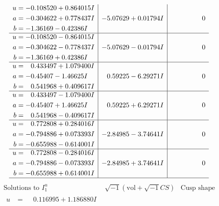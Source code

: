 \documentclass[1p]{elsarticle_modified}
\theoremstyle{definition}
\newcommand{\I}{\sqrt{-1}}
\begin{document}
$$\begin{array}{c|c|c}
\begin{aligned}
u &= -0.108520 + 0.864015 I \\
a &= -0.304622 + 0.778437 I \\
b &= -1.36169 - 0.42386 I\end{aligned}
 & -5.07629 + 0.01794 I & \phantom{-0.000000 } 0 \\ \hline\begin{aligned}
u &= -0.108520 - 0.864015 I \\
a &= -0.304622 - 0.778437 I \\
b &= -1.36169 + 0.42386 I\end{aligned}
 & -5.07629 - 0.01794 I & \phantom{-0.000000 } 0 \\ \hline\begin{aligned}
u &= \phantom{-}0.433497 + 1.079400 I \\
a &= -0.45407 - 1.46625 I \\
b &= \phantom{-}0.541968 + 0.409617 I\end{aligned}
 & \phantom{-}0.59225 - 6.29271 I & \phantom{-0.000000 } 0 \\ \hline\begin{aligned}
u &= \phantom{-}0.433497 - 1.079400 I \\
a &= -0.45407 + 1.46625 I \\
b &= \phantom{-}0.541968 - 0.409617 I\end{aligned}
 & \phantom{-}0.59225 + 6.29271 I & \phantom{-0.000000 } 0 \\ \hline\begin{aligned}
u &= \phantom{-}0.772808 + 0.284016 I \\
a &= -0.794886 + 0.073393 I \\
b &= -0.655988 - 0.614001 I\end{aligned}
 & -2.84985 - 3.74641 I & \phantom{-0.000000 } 0 \\ \hline\begin{aligned}
u &= \phantom{-}0.772808 - 0.284016 I \\
a &= -0.794886 - 0.073393 I \\
b &= -0.655988 + 0.614001 I\end{aligned}
 & -2.84985 + 3.74641 I & \phantom{-0.000000 } 0\\
 \hline 
 \end{array}$$\newpage$$\begin{array}{c|c|c}  
\text{Solutions to }I^u_{1}& \I (\text{vol} + \sqrt{-1}CS) & \text{Cusp shape}\\
 \hline 
\begin{aligned}
u &= \phantom{-}0.116995 + 1.186880 I \\

\end{aligned}
\end{array}$$
\end{document}
